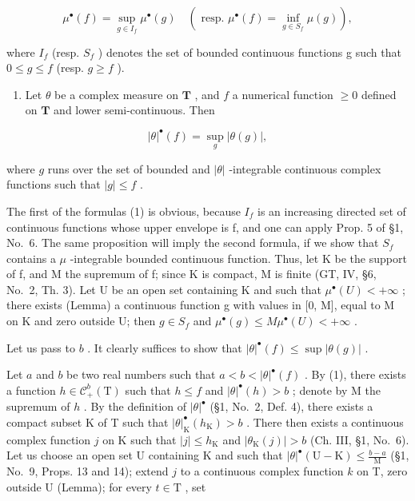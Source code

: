 \[
\mu^ {\bullet} (f) = \sup _ {g \in I _ {f}} \mu^ {\bullet} (g) \quad (\text { resp. } \mu^ {\bullet} (f) = \inf _ {g \in S _ {f}} \mu (g)),\tag{1}
\]

where \(I_{f}\) (resp. \(S_{f}\) ) denotes the set of bounded continuous functions g such that \(0 \leqslant g \leqslant f\) (resp. \(g \geqslant f\) ).

\begin{enumerate}
\def\labelenumi{\alph{enumi})}
\setcounter{enumi}{1}
\tightlist
\item
  Let \(\theta\) be a complex measure on \(\mathbf{T}\) , and \(f\) a numerical function \(\geqslant 0\) defined on \(\mathbf{T}\) and lower semi-continuous. Then
\end{enumerate}

\[
| \theta | ^ {\bullet} (f) = \sup _ {g} | \theta (g) |,\tag{2}
\]

where \(g\) runs over the set of bounded and \(|\theta|\) -integrable continuous complex functions such that \(|g| \leqslant f\) .

The first of the formulas (1) is obvious, because \(I_{f}\) is an increasing directed set of continuous functions whose upper envelope is f, and one can apply Prop. 5 of §1, No.~6. The same proposition will imply the second formula, if we show that \(S_{f}\) contains a \(\mu\) -integrable bounded continuous function. Thus, let K be the support of f, and M the supremum of f; since K is compact, M is finite (GT, IV, §6, No.~2, Th. 3). Let U be an open set containing K and such that \(\mu^{\bullet}(U) < +\infty\) ; there exists (Lemma) a continuous function g with values in {[}0, M{]}, equal to M on K and zero outside U; then \(g \in S_{f}\) and \(\mu^{\bullet}(g) \leqslant M\mu^{\bullet}(U) < +\infty\) .

Let us pass to \(b\) . It clearly suffices to show that \(|\theta|^{\bullet}(f) \leqslant \sup |\theta(g)|\) .

Let \(a\) and \(b\) be two real numbers such that \(a < b < |\theta|^{\bullet}(f)\) . By (1), there exists a function \(h \in \mathcal{C}_{+}^{b}(\mathrm{T})\) such that \(h \leqslant f\) and \(|\theta|^{\bullet}(h) > b\) ; denote by M the supremum of \(h\) . By the definition of \(|\theta|^{\bullet}\) (§1, No.~2, Def. 4), there exists a compact subset K of T such that \(|\theta|_{\mathrm{K}}^{\bullet}(h_{\mathrm{K}}) > b\) . There then exists a continuous complex function \(j\) on K such that \(|j| \leqslant h_{\mathrm{K}}\) and \(|\theta_{\mathrm{K}}(j)| > b\) (Ch. III, §1, No.~6). Let us choose an open set U containing K and such that \(|\theta|^{\bullet}(\mathrm{U} - \mathrm{K}) \leqslant \frac{b - a}{\mathrm{M}}\) (§1, No.~9, Props. 13 and 14); extend \(j\) to a continuous complex function \(k\) on T, zero outside U (Lemma); for every \(t \in \mathrm{T}\) , set

